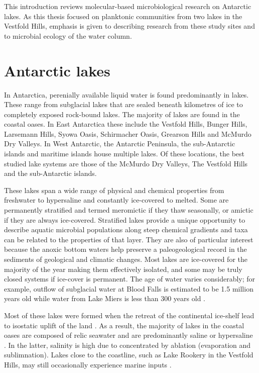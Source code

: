 This introduction reviews molecular-based microbiological research on Antarctic lakes.
As this thesis focused on planktonic communities from two lakes in the Vestfold Hills, emphasis is given to describing research from these study sites and to microbial ecology of the water column.


\section{Antarctic lakes}
In Antarctica, perenially available liquid water is found predominantly in lakes.
These range from subglacial lakes that are sealed beneath kilometres of ice to completely exposed rock-bound lakes.
The majority of lakes are found in the coastal oases. 
In East Antarctica these include the Vestfold Hills, Bunger Hills, Larsemann Hills, Syowa Oasis, Schirmacher Oasis, Grearson Hills and McMurdo Dry Valleys.
In West Antarctic, the Antarctic Peninsula, the sub-Antarctic islands and maritime islands house multiple lakes. 
Of these locations, the best studied lake systems are those of the McMurdo Dry Valleys, The Vestfold Hills and the sub-Antarctic islands.

These lakes span a wide range of physical and chemical properties from freshwater to hypersaline and constantly ice-covered to melted.
Some are permanently stratified and termed meromictic if they thaw seasonally, or amictic if they are always ice-covered.
Stratified lakes provide a unique opportunity to describe aquatic microbial populations along steep chemical gradients and taxa can be related to the properties of that layer.  
They are also of particular interest because the anoxic bottom waters help preserve a paleogeological record in the sediments of geological and climatic changes.
Most lakes are ice-covered for the majority of the year making them effectively isolated, and some may be truly closed systems if ice-cover is permanent.
The age of water varies considerably; for example, outflow of subglacial water at Blood Falls is estimated to be 1.5 million years old \cite{Mikucki2009} while water from Lake Miers is less than 300 years old \cite{Green1988}. 

Most of these lakes were formed when the retreat of the continental ice-shelf lead to isostatic uplift of the land \cite{Burton1981}. %
As a result, the majority of lakes in the coastal oases are composed of relic seawater and are predominantly saline or hypersaline \cite{Burke1988}.
In the latter, salinity is high due to concentrated by ablation (evaporation and sublimnation). %
Lakes close to the coastline, such as Lake Rookery in the Vestfold Hills, may still occasionally experience marine inputs \cite{Burton1981}.

